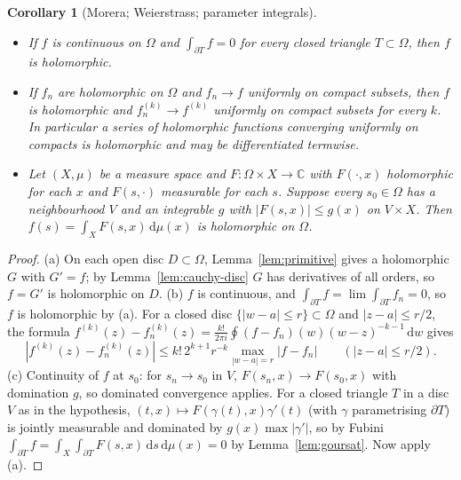 \documentclass[11pt]{article}
\newtheorem{corollary}[theorem]{Corollary}
\theoremstyle{definition}
\newcommand{\C}{\mathbb{C}}
\newcommand{\dd}{\,\mathrm{d}}
\begin{document}
\begin{corollary}[Morera; Weierstrass; parameter integrals]\label{cor:morera}
\begin{itemize}
\item[(a)] If $f$ is continuous on $\Omega$ and $\int_{\partial T}f=0$ for every closed triangle $T\subset\Omega$, then $f$ is holomorphic.
\item[(b)] If $f_n$ are holomorphic on $\Omega$ and $f_n\to f$ uniformly on compact subsets, then $f$ is holomorphic and $f_n^{(k)}\to f^{(k)}$ uniformly on compact subsets for every $k$. In particular a series of holomorphic functions converging uniformly on compacts is holomorphic and may be differentiated termwise.
\item[(c)] Let $(X,\mu)$ be a measure space and $F:\Omega\times X\to\C$ with $F(\cdot,x)$ holomorphic for each $x$ and $F(s,\cdot)$ measurable for each $s$. Suppose every $s_0\in\Omega$ has a neighbourhood $V$ and an integrable $g$ with $|F(s,x)|\le g(x)$ on $V\times X$. Then $f(s)=\int_XF(s,x)\dd\mu(x)$ is holomorphic on $\Omega$.
\end{itemize}
\end{corollary}
\begin{proof}
(a) On each open disc $D\subset\Omega$, Lemma~\ref{lem:primitive} gives a holomorphic $G$ with $G'=f$; by Lemma~\ref{lem:cauchy-disc} $G$ has derivatives of all orders, so $f=G'$ is holomorphic on $D$.
(b) $f$ is continuous, and $\int_{\partial T}f=\lim\int_{\partial T}f_n=0$, so $f$ is holomorphic by (a). For a closed disc $\{|w-a|\le r\}\subset\Omega$ and $|z-a|\le r/2$, the formula $f^{(k)}(z)-f_n^{(k)}(z)=\frac{k!}{2\pi i}\oint(f-f_n)(w)(w-z)^{-k-1}\dd w$ gives
\[
|f^{(k)}(z)-f_n^{(k)}(z)|\le k!\,2^{k+1}r^{-k}\max_{|w-a|=r}|f-f_n|\qquad(|z-a|\le r/2).
\]
(c) Continuity of $f$ at $s_0$: for $s_n\to s_0$ in $V$, $F(s_n,x)\to F(s_0,x)$ with domination $g$, so dominated convergence applies. For a closed triangle $T$ in a disc $V$ as in the hypothesis, $(t,x)\mapsto F(\gamma(t),x)\gamma'(t)$ (with $\gamma$ parametrising $\partial T$) is jointly measurable and dominated by $g(x)\max|\gamma'|$, so by Fubini $\int_{\partial T}f=\int_X\int_{\partial T}F(s,x)\dd s\dd\mu(x)=0$ by Lemma~\ref{lem:goursat}. Now apply (a).
\end{proof}
\end{document}
